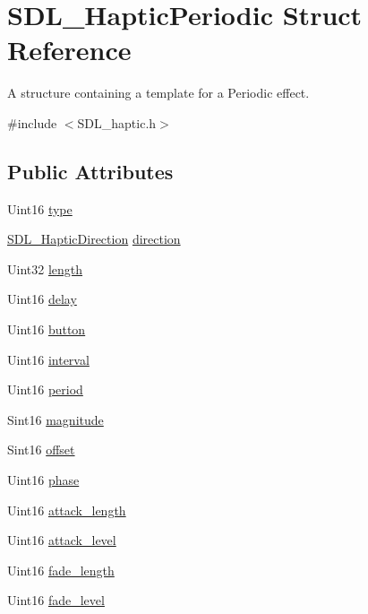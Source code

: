 \hypertarget{structSDL__HapticPeriodic}{\section{S\+D\+L\+\_\+\+Haptic\+Periodic Struct Reference}
\label{structSDL__HapticPeriodic}
}


A structure containing a template for a Periodic effect.  




{\ttfamily \#include $<$S\+D\+L\+\_\+haptic.\+h$>$}

\subsection*{Public Attributes}
\begin{DoxyCompactItemize}
\item 
Uint16 \hyperlink{structSDL__HapticPeriodic_ac53c5725e8cff012e9b90e01b7110869}{type}
\item 
\hyperlink{structSDL__HapticDirection}{S\+D\+L\+\_\+\+Haptic\+Direction} \hyperlink{structSDL__HapticPeriodic_a2c4f27d4583187a7a994e79ad49083d3}{direction}
\item 
Uint32 \hyperlink{structSDL__HapticPeriodic_a0ef0b17c54aaa5c99886c2a618444026}{length}
\item 
Uint16 \hyperlink{structSDL__HapticPeriodic_a8688d1c7ee6270ed290f6b474aef5ec9}{delay}
\item 
Uint16 \hyperlink{structSDL__HapticPeriodic_a9e0177354f4a285b8c98e4a31cd31752}{button}
\item 
Uint16 \hyperlink{structSDL__HapticPeriodic_a076d266e917098d89b2385b631629162}{interval}
\item 
Uint16 \hyperlink{structSDL__HapticPeriodic_a0e7e105b96308129b248d52b56a2a839}{period}
\item 
Sint16 \hyperlink{structSDL__HapticPeriodic_aad0ad2b00c7e6959da627663d91f7b94}{magnitude}
\item 
Sint16 \hyperlink{structSDL__HapticPeriodic_abc7aa9e9c0d546cb54189a7812fbe554}{offset}
\item 
Uint16 \hyperlink{structSDL__HapticPeriodic_a25e8c6aebc78bd74b9343fa228d25d8f}{phase}
\item 
Uint16 \hyperlink{structSDL__HapticPeriodic_ab35eedce7107edc75640586159fe75bb}{attack\+\_\+length}
\item 
Uint16 \hyperlink{structSDL__HapticPeriodic_a79fc2217fea6db6ab3d89ad905d52ccb}{attack\+\_\+level}
\item 
Uint16 \hyperlink{structSDL__HapticPeriodic_ae1c186d02304eae142a62dca72f50fa8}{fade\+\_\+length}
\item 
Uint16 \hyperlink{structSDL__HapticPeriodic_afa7713fc264959873f2a852fca4174fd}{fade\+\_\+level}
\end{DoxyCompactItemize}


